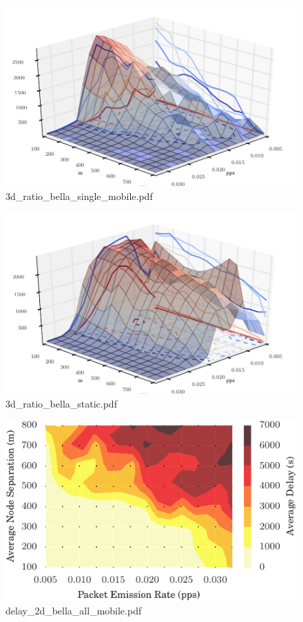 \documentclass{article}
\begin{document}
\begin{figure}[h!]
\centering
\includegraphics[width=\linewidth]{3d_ratio_bella_single_mobile.pdf}
\caption{3d\_ratio\_bella\_single\_mobile.pdf}
\end{figure}




\begin{figure}[h!]
\centering
\includegraphics[width=\linewidth]{3d_ratio_bella_static.pdf}
\caption{3d\_ratio\_bella\_static.pdf}
\end{figure}




\begin{figure}[h!]
\centering
\includegraphics[width=\linewidth]{delay_2d_bella_all_mobile.pdf}
\caption{delay\_2d\_bella\_all\_mobile.pdf}
\end{figure}
\end{document}
